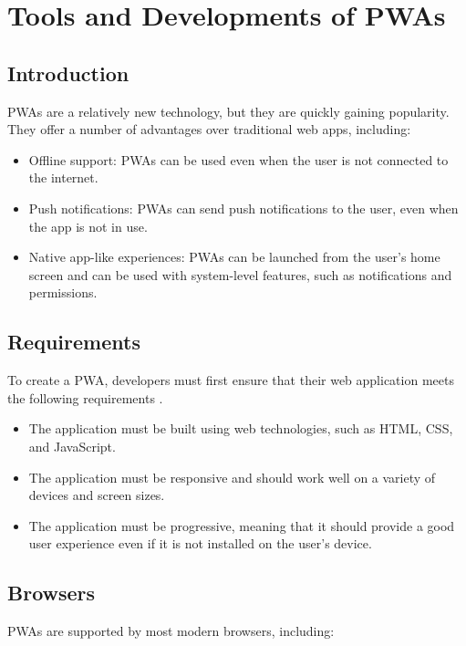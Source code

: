 \documentclass{report}
\begin{document}


\tableofcontents

\chapter{Tools and Developments of PWAs}\label{Tools and Developments of PWAs}
\section{Introduction}\label{intro}
PWAs are a relatively new technology, but they are quickly gaining popularity. They offer a number of advantages over traditional web apps, including: 
\begin{itemize}
    \item Offline support: PWAs can be used even when the user is not connected to the internet.
    \item Push notifications: PWAs can send push notifications to the user, even when the app is not in use.
    \item Native app-like experiences: PWAs can be launched from the user's home screen and can be used with system-level features, such as notifications and permissions.
\end{itemize}
\section{Requirements}\label{Requirements}

To create a PWA, developers must first ensure that their web application meets the following requirements .\cite{mdn23}
\begin{itemize}
    \item The application must be built using web technologies, such as HTML, CSS, and JavaScript.
    \item The application must be responsive and should work well on a variety of devices and screen sizes.
    \item The application must be progressive, meaning that it should provide a good user experience even if it is not installed on the user's device.
\end{itemize}

\section{Browsers}\label{Browsers}

PWAs are supported by most modern browsers, including: 
\end{document}
